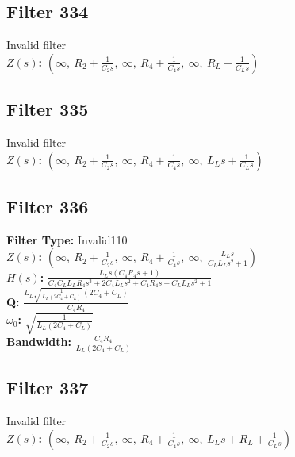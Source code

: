 \documentclass{article}
\begin{document}
\subsection*{Filter 334}
Invalid filter \\ 
\textbf{$Z(s)$:} $\left( \infty, \  R_{2} + \frac{1}{C_{2} s}, \  \infty, \  R_{4} + \frac{1}{C_{4} s}, \  \infty, \  R_{L} + \frac{1}{C_{L} s}\right)$ \\ 
\subsection*{Filter 335}
Invalid filter \\ 
\textbf{$Z(s)$:} $\left( \infty, \  R_{2} + \frac{1}{C_{2} s}, \  \infty, \  R_{4} + \frac{1}{C_{4} s}, \  \infty, \  L_{L} s + \frac{1}{C_{L} s}\right)$ \\ 
\subsection*{Filter 336}
\textbf{Filter Type:} Invalid110 \\ 
\textbf{$Z(s)$:} $\left( \infty, \  R_{2} + \frac{1}{C_{2} s}, \  \infty, \  R_{4} + \frac{1}{C_{4} s}, \  \infty, \  \frac{L_{L} s}{C_{L} L_{L} s^{2} + 1}\right)$ \\ 
\textbf{$H(s)$:} $\frac{L_{L} s \left(C_{4} R_{4} s + 1\right)}{C_{4} C_{L} L_{L} R_{4} s^{3} + 2 C_{4} L_{L} s^{2} + C_{4} R_{4} s + C_{L} L_{L} s^{2} + 1}$ \\ 
\textbf{Q:} $\frac{L_{L} \sqrt{\frac{1}{L_{L} \left(2 C_{4} + C_{L}\right)}} \left(2 C_{4} + C_{L}\right)}{C_{4} R_{4}}$ \\ 
\textbf{$\omega_0$:} $\sqrt{\frac{1}{L_{L} \left(2 C_{4} + C_{L}\right)}}$ \\ 
\textbf{Bandwidth:} $\frac{C_{4} R_{4}}{L_{L} \left(2 C_{4} + C_{L}\right)}$ \\ 
\subsection*{Filter 337}
Invalid filter \\ 
\textbf{$Z(s)$:} $\left( \infty, \  R_{2} + \frac{1}{C_{2} s}, \  \infty, \  R_{4} + \frac{1}{C_{4} s}, \  \infty, \  L_{L} s + R_{L} + \frac{1}{C_{L} s}\right)$ \\ 
\end{document}
